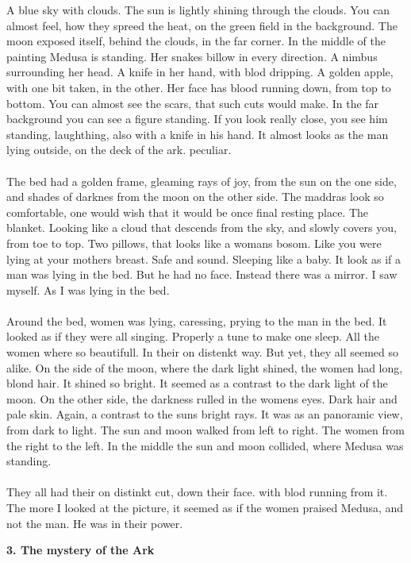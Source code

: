 \documentclass[]{article}
\begin{document}
A blue sky with clouds. The sun is lightly shining through the clouds. You can almost feel, how they spreed the heat, on the green field in the background. The moon exposed itself, behind the clouds, in the far corner. In the middle of the painting Medusa is standing. Her snakes billow in every direction. A nimbus surrounding her head. A knife in her hand, with blod dripping. A golden apple, with one bit taken, in the other. Her face has blood running down, from top to bottom. You can almost see the scars, that such cuts would make. In the far background you can see a figure standing. If you look really close, you see him standing, laughthing, also with a knife in his hand. It almost looks as the man lying outside, on the deck of the ark. peculiar.
\\ \\
The bed had a golden frame, gleaming rays of joy, from the sun on the one side, and shades of darknes from the moon on the other side. The maddras look so comfortable, one would wish that it would be once final resting place. The blanket. Looking like a cloud that descends from the sky, and slowly covers you, from toe to top. Two pillows, that looks like a womans bosom. Like you were lying at your mothers breast. Safe and sound. Sleeping like a baby. It look as if a man was lying in the bed. But he had no face. Instead there was a mirror. I saw myself. As I was lying in the bed.
\\ \\
Around the bed, women was lying, caressing, prying to the man in the bed. It looked as if they were all singing. Properly a tune to make one sleep. All the women where so beautifull. In their on distenkt way. But yet, they all seemed so alike. On the side of the moon, where the dark light shined, the women had long, blond hair. It shined so bright. It seemed as a contrast to the dark light of the moon. On the other side, the darkness rulled in the womens eyes. Dark hair and pale skin. Again, a contrast to the suns bright rays. It was as an panoramic view, from dark to light. The sun and moon walked from left to right. The women from the right to the left. In the middle the sun and moon collided, where Medusa was standing. 
\\ \\
They all had their on distinkt cut, down their face. with blod running from it. The more I looked at the picture, it seemed as if the women praised Medusa, and not the man. He was in their power. 

\begin{center}
	\large\textbf{3. The mystery of the Ark}
\end{center}
\end{document}
